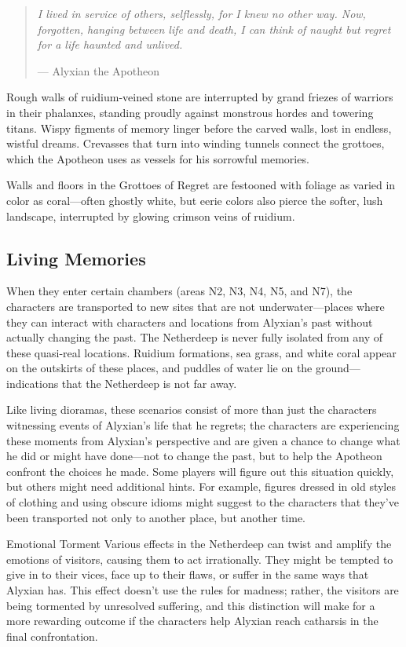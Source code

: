 \documentclass[a4paper, 11pt, bg=full, twocolumn, nooutline]{dndbook}
\begin{document}
\begin{quotation}
\em
I lived in service of others, selflessly, for I knew no other way. Now, forgotten, hanging between life and death, I can think of naught but regret for a life haunted and unlived.

\hfill --- Alyxian the Apotheon
\end{quotation}

Rough walls of ruidium-veined stone are interrupted by grand friezes of warriors in their phalanxes, standing proudly against monstrous hordes and towering titans. Wispy figments of memory linger before the carved walls, lost in endless, wistful dreams. Crevasses that turn into winding tunnels connect the grottoes, which the Apotheon uses as vessels for his sorrowful memories.

Walls and floors in the Grottoes of Regret are festooned with foliage as varied in color as coral---often ghostly white, but eerie colors also pierce the softer, lush landscape, interrupted by glowing crimson veins of ruidium.

\subsection{Living Memories}

When they enter certain chambers (areas N2, N3, N4, N5, and N7), the characters are transported to new sites that are not underwater---places where they can interact with characters and locations from Alyxian's past without actually changing the past. The Netherdeep is never fully isolated from any of these quasi-real locations. Ruidium formations, sea grass, and white coral appear on the outskirts of these places, and puddles of water lie on the ground---indications that the Netherdeep is not far away.

Like living dioramas, these scenarios consist of more than just the characters witnessing events of Alyxian's life that he regrets; the characters are experiencing these moments from Alyxian's perspective and are given a chance to change what he did or might have done---not to change the past, but to help the Apotheon confront the choices he made. Some players will figure out this situation quickly, but others might need additional hints. For example, figures dressed in old styles of clothing and using obscure idioms might suggest to the characters that they've been transported not only to another place, but another time.

\begin{DndSidebar}{Emotional Torment}
Various effects in the Netherdeep can twist and amplify the emotions of visitors, causing them to act irrationally. They might be tempted to give in to their vices, face up to their flaws, or suffer in the same ways that Alyxian has. This effect doesn't use the rules for madness; rather, the visitors are being tormented by unresolved suffering, and this distinction will make for a more rewarding outcome if the characters help Alyxian reach catharsis in the final confrontation.
\end{DndSidebar}
\end{document}
